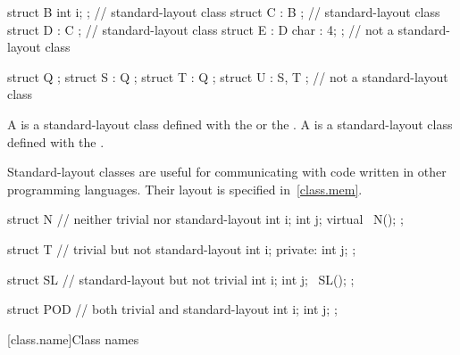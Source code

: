 \pnum
\begin{example}
\begin{codeblock}
   struct B { int i; };         // standard-layout class
   struct C : B { };            // standard-layout class
   struct D : C { };            // standard-layout class
   struct E : D { char : 4; };  // not a standard-layout class

   struct Q {};
   struct S : Q { };
   struct T : Q { };
   struct U : S, T { };         // not a standard-layout class
\end{codeblock}
\end{example}

\pnum
A  is a standard-layout class
defined with the   or the
 .
A  is a standard-layout class
defined with the
 .

\pnum
\begin{note} Standard-layout classes are useful for communicating with
code written in other programming languages. Their layout is specified
in~\ref{class.mem}.\end{note}

\pnum
\begin{example}
\begin{codeblock}
struct N {          // neither trivial nor standard-layout
  int i;
  int j;
  virtual ~N();
};

struct T {          // trivial but not standard-layout
  int i;
private:
  int j;
};

struct SL {         // standard-layout but not trivial
  int i;
  int j;
  ~SL();
};

struct POD {        // both trivial and standard-layout
  int i;
  int j;
};
\end{codeblock}
\end{example}

[class.name]{Class names}
%
%
%

